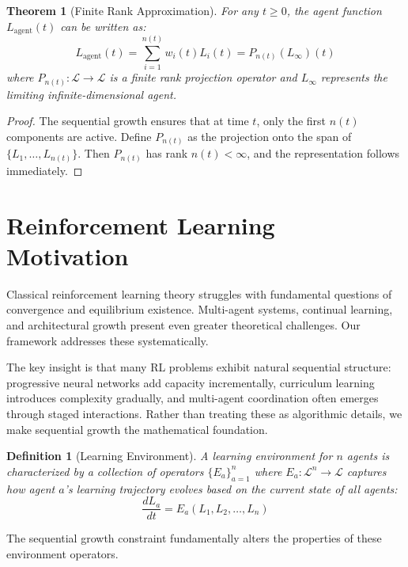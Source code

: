 \documentclass[11pt]{article}
\newtheorem{theorem}{Theorem}
\newtheorem{definition}{Definition}
\begin{document}
\begin{theorem}[Finite Rank Approximation]
For any $t \geq 0$, the agent function $L_{\text{agent}}(t)$ can be written as:
\begin{equation}
L_{\text{agent}}(t) = \sum_{i=1}^{n(t)} w_i(t) L_i(t) = P_{n(t)}(L_{\infty})(t)
\end{equation}
where $P_{n(t)}: \mathcal{L} \to \mathcal{L}$ is a finite rank projection operator and $L_{\infty}$ represents the limiting infinite-dimensional agent.
\end{theorem}

\begin{proof}
The sequential growth ensures that at time $t$, only the first $n(t)$ components are active. Define $P_{n(t)}$ as the projection onto the span of $\{L_1, \ldots, L_{n(t)}\}$. Then $P_{n(t)}$ has rank $n(t) < \infty$, and the representation follows immediately.
\end{proof}

\section{Reinforcement Learning Motivation}

Classical reinforcement learning theory struggles with fundamental questions of convergence and equilibrium existence. Multi-agent systems, continual learning, and architectural growth present even greater theoretical challenges. Our framework addresses these systematically.

The key insight is that many RL problems exhibit natural sequential structure: progressive neural networks add capacity incrementally, curriculum learning introduces complexity gradually, and multi-agent coordination often emerges through staged interactions. Rather than treating these as algorithmic details, we make sequential growth the mathematical foundation.

\begin{definition}[Learning Environment]
A learning environment for $n$ agents is characterized by a collection of operators $\{E_a\}_{a=1}^n$ where $E_a: \mathcal{L}^n \to \mathcal{L}$ captures how agent $a$'s learning trajectory evolves based on the current state of all agents:
\begin{equation}
\frac{dL_a}{dt} = E_a(L_1, L_2, \ldots, L_n)
\end{equation}
\end{definition}

The sequential growth constraint fundamentally alters the properties of these environment operators.
\end{document}
